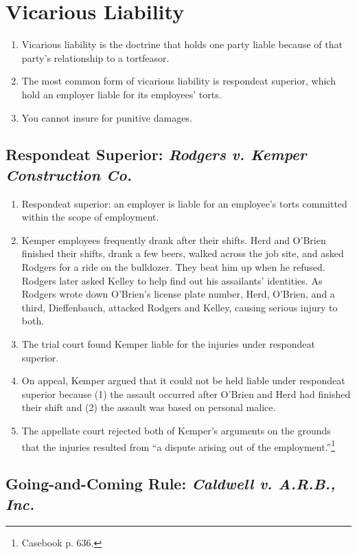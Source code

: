 \section{Vicarious Liability}

\begin{enumerate}
    \item Vicarious liability is the doctrine that holds one party liable
    because of that party's relationship to a tortfeasor.
    \item The most common form of vicarious liability is respondeat superior,
    which hold an employer liable for its employees' torts.
    \item You cannot insure for punitive damages.
\end{enumerate}

\subsection{Respondeat Superior: \emph{Rodgers v. Kemper Construction Co.}}

\begin{enumerate}
    \item Respondeat superior: an employer is liable for an employee's torts 
    committed within the scope of employment.
    \item Kemper employees frequently drank after their shifts. Herd and O'Brien 
    finished their shifts, drank a few beers, walked across the job site, and 
    asked Rodgers for a ride on the bulldozer. They beat him up when he refused. 
    Rodgers later asked Kelley to help find out his assailants' identities. As 
    Rodgers wrote down O'Brien's license plate number, Herd, O'Brien, and a 
    third, Dieffenbauch, attacked Rodgers and Kelley, causing serious injury to 
    both.
    \item The trial court found Kemper liable for the injuries under respondeat 
    superior.
    \item On appeal, Kemper argued that it could not be held liable under 
    respondeat superior because (1) the assault occurred after O'Brien and Herd 
    had finished their shift and (2) the assault was based on personal malice.
    \item The appellate court rejected both of Kemper's arguments on the grounds 
    that the injuries resulted from ``a dispute arising out of the 
    employment.''\footnote{Casebook p. 636.}
\end{enumerate}

\subsection{Going-and-Coming Rule: \emph{Caldwell v. A.R.B., Inc.}}

